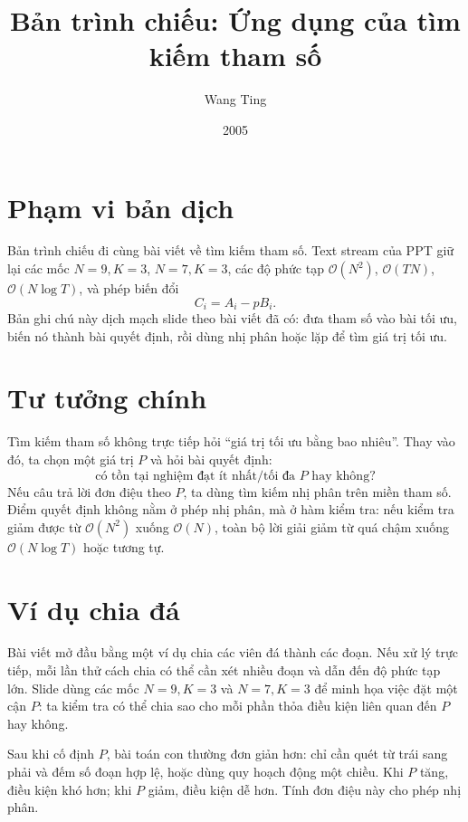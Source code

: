 \documentclass[11pt]{article}
\title{Bản trình chiếu: Ứng dụng của tìm kiếm tham số}
\author{Wang Ting}
\date{2005}
\newcommand{\Oh}{\mathcal{O}}
\begin{document}
\maketitle


\section{Phạm vi bản dịch}

Bản trình chiếu đi cùng bài viết về tìm kiếm tham số. Text stream của PPT giữ
lại các mốc \(N=9,K=3\), \(N=7,K=3\), các độ phức tạp
\(\Oh(N^2)\), \(\Oh(TN)\), \(\Oh(N\log T)\), và phép biến đổi
\[
  C_i=A_i-pB_i.
\]
Bản ghi chú này dịch mạch slide theo bài viết đã có: đưa tham số vào bài tối
ưu, biến nó thành bài quyết định, rồi dùng nhị phân hoặc lặp để tìm giá trị
tối ưu.

\section{Tư tưởng chính}

Tìm kiếm tham số không trực tiếp hỏi ``giá trị tối ưu bằng bao nhiêu''. Thay
vào đó, ta chọn một giá trị \(P\) và hỏi bài quyết định:
\[
  \text{có tồn tại nghiệm đạt ít nhất/tối đa }P\text{ hay không?}
\]
Nếu câu trả lời đơn điệu theo \(P\), ta dùng tìm kiếm nhị phân trên miền tham
số. Điểm quyết định không nằm ở phép nhị phân, mà ở hàm kiểm tra: nếu kiểm tra
giảm được từ \(\Oh(N^2)\) xuống \(\Oh(N)\), toàn bộ lời giải giảm từ quá chậm
xuống \(\Oh(N\log T)\) hoặc tương tự.

\section{Ví dụ chia đá}

Bài viết mở đầu bằng một ví dụ chia các viên đá thành các đoạn. Nếu xử lý trực
tiếp, mỗi lần thử cách chia có thể cần xét nhiều đoạn và dẫn đến độ phức tạp
lớn. Slide dùng các mốc \(N=9,K=3\) và \(N=7,K=3\) để minh họa việc đặt một
cận \(P\): ta kiểm tra có thể chia sao cho mỗi phần thỏa điều kiện liên quan
đến \(P\) hay không.

Sau khi cố định \(P\), bài toán con thường đơn giản hơn: chỉ cần quét từ trái
sang phải và đếm số đoạn hợp lệ, hoặc dùng quy hoạch động một chiều. Khi \(P\)
tăng, điều kiện khó hơn; khi \(P\) giảm, điều kiện dễ hơn. Tính đơn điệu này
cho phép nhị phân.
\end{document}
